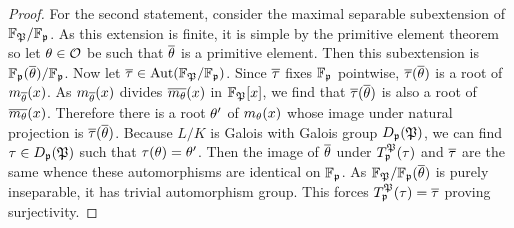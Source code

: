 \begin{proof}
      For the second statement, consider the maximal separable subextension of \(\mathbb{F}_{\mathfrak{P}}/\mathbb{F}_{\mathfrak{p}}\). As this extension is finite, it is simple by the primitive element theorem so let \(\theta \in \mathcal{O}\) be such that \(\overline{\theta}\) is a primitive element. Then this subextension is \(\mathbb{F}_{\mathfrak{p}}(\overline{\theta})/\mathbb{F}_{\mathfrak{p}}\). Now let \(\overline{\tau} \in \operatorname{\mathrm{Aut}}(\mathbb{F}_{\mathfrak{P}}/\mathbb{F}_{\mathfrak{p}})\). Since \(\overline{\tau}\) fixes \(\mathbb{F}_{\mathfrak{p}}\) pointwise, \(\overline{\tau}(\overline{\theta})\) is a root of \(m_{\overline{\theta}}(x)\). As \(m_{\overline{\theta}}(x)\) divides \(\overline{m_{\theta}}(x)\) in \(\mathbb{F}_{\mathfrak{P}}[x]\), we find that \(\overline{\tau}(\overline{\theta})\) is also a root of \(\overline{m_{\theta}}(x)\). Therefore there is a root \(\theta'\) of \(m_{\theta}(x)\) whose image under natural projection is \(\overline{\tau}(\overline{\theta})\). Because \(L/K\) is Galois with Galois group \(D_{\mathfrak{p}}(\mathfrak{P})\), we can find \(\tau \in D_{\mathfrak{p}}(\mathfrak{P})\) such that \(\tau(\theta) = \theta'\). Then the image of \(\overline{\theta}\) under \(T_{\mathfrak{p}}^{\mathfrak{P}}(\tau)\) and \(\overline{\tau}\) are the same whence these automorphisms are identical on \(\mathbb{F}_{\mathfrak{p}}\). As \(\mathbb{F}_{\mathfrak{P}}/\mathbb{F}_{\mathfrak{p}}(\overline{\theta})\) is purely inseparable, it has trivial automorphism group. This forces \(T_{\mathfrak{p}}^{\mathfrak{P}}(\tau) = \overline{\tau}\) proving surjectivity.
    \end{proof}

